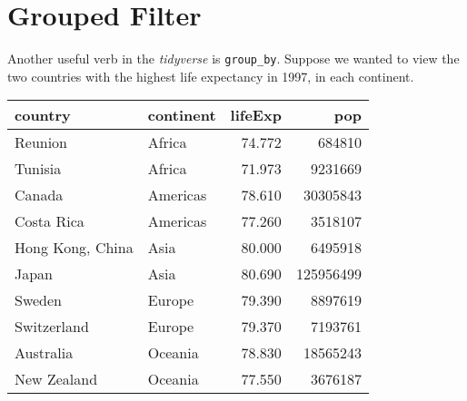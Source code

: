\documentclass[]{book}
\newenvironment{Shaded}{\begin{snugshade}}{\end{snugshade}}
\newcommand{\KeywordTok}[1]{\textcolor[rgb]{0.13,0.29,0.53}{\textbf{#1}}}
\newcommand{\DataTypeTok}[1]{\textcolor[rgb]{0.13,0.29,0.53}{#1}}
\newcommand{\DecValTok}[1]{\textcolor[rgb]{0.00,0.00,0.81}{#1}}
\newcommand{\StringTok}[1]{\textcolor[rgb]{0.31,0.60,0.02}{#1}}
\newcommand{\OperatorTok}[1]{\textcolor[rgb]{0.81,0.36,0.00}{\textbf{#1}}}
\newcommand{\NormalTok}[1]{#1}
\begin{document}
\section{Grouped Filter}\label{grouped-filter}

Another useful verb in the \emph{tidyverse} is \texttt{group\_by}.
Suppose we wanted to view the two countries with the highest life
expectancy in 1997, in each continent.

\begin{Shaded}
\end{Shaded}

\begin{tabular}{l|l|r|r}
\hline
country & continent & lifeExp & pop\\
\hline
Reunion & Africa & 74.772 & 684810\\
\hline
Tunisia & Africa & 71.973 & 9231669\\
\hline
Canada & Americas & 78.610 & 30305843\\
\hline
Costa Rica & Americas & 77.260 & 3518107\\
\hline
Hong Kong, China & Asia & 80.000 & 6495918\\
\hline
Japan & Asia & 80.690 & 125956499\\
\hline
Sweden & Europe & 79.390 & 8897619\\
\hline
Switzerland & Europe & 79.370 & 7193761\\
\hline
Australia & Oceania & 78.830 & 18565243\\
\hline
New Zealand & Oceania & 77.550 & 3676187\\
\hline
\end{tabular}
\end{document}
